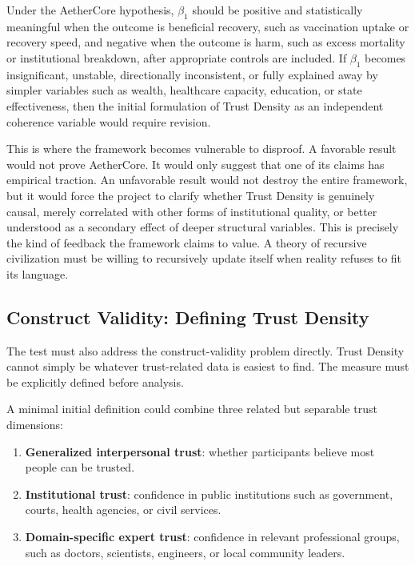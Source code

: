 \documentclass[12pt]{article}
\begin{document}
Under the AetherCore hypothesis, \(\beta_1\) should be positive and statistically meaningful when the outcome is beneficial recovery, such as vaccination uptake or recovery speed, and negative when the outcome is harm, such as excess mortality or institutional breakdown, after appropriate controls are included. If \(\beta_1\) becomes insignificant, unstable, directionally inconsistent, or fully explained away by simpler variables such as wealth, healthcare capacity, education, or state effectiveness, then the initial formulation of Trust Density as an independent coherence variable would require revision.

This is where the framework becomes vulnerable to disproof. A favorable result would not prove AetherCore. It would only suggest that one of its claims has empirical traction. An unfavorable result would not destroy the entire framework, but it would force the project to clarify whether Trust Density is genuinely causal, merely correlated with other forms of institutional quality, or better understood as a secondary effect of deeper structural variables. This is precisely the kind of feedback the framework claims to value. A theory of recursive civilization must be willing to recursively update itself when reality refuses to fit its language.

\subsection{Construct Validity: Defining Trust Density}

The test must also address the construct-validity problem directly. Trust Density cannot simply be whatever trust-related data is easiest to find. The measure must be explicitly defined before analysis.

A minimal initial definition could combine three related but separable trust dimensions:

\begin{enumerate}
  \item \textbf{Generalized interpersonal trust}: whether participants believe most people can be trusted.
  \item \textbf{Institutional trust}: confidence in public institutions such as government, courts, health agencies, or civil services.
  \item \textbf{Domain-specific expert trust}: confidence in relevant professional groups, such as doctors, scientists, engineers, or local community leaders.
\end{enumerate}
\end{document}
